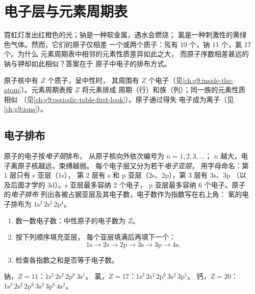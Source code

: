\chapter{电子层与元素周期表}\label{ch:g10:electron-shells}

霓虹灯发出红橙色的光；钠是一种软金属，遇水会燃烧；
氯是一种刺激性的黄绿色气体。然而，它们的原子仅相差
一个或两个质子：氖有 10 个，钠 11 个，氯 17 个。为什么
元素周期表中相邻的元素性质差异如此之大，
而原子序数相差甚远的钠与钾却如此相似？答案在于
原子中电子的排布方式。

\begin{recall}
原子核中有 $Z$ 个质子，呈中性时，
其周围有 $Z$ 个电子（见\cref{ch:g9:inside-the-atom}）。元素周期表按 $Z$ 将元素排成
周期（行）和族（列）；同一族的元素性质相似
（见\cref{ch:g9:periodic-table-first-look}）。原子通过得失
电子成为离子（见\cref{ch:g9:ions}）。
\end{recall}

\section{电子排布}

\begin{definition}\label{def:g10:electron-shells:configuration}
原子的电子按\emph{电子层}排布，
从原子核向外依次编号为 $n = 1, 2, 3, \ldots$；
$n$ 越大，电子离原子核越远，束缚越弱。
每个电子层又分为若干\emph{电子亚层}，
用字母命名：第 1 层只有 s 亚层（1s），
第 2 层有 s 和 p 亚层（2s、2p），第 3 层有 3s、3p
（以及后面才学的 3d）。s 亚层最多容纳 2 个电子，
p 亚层最多容纳 6 个电子。原子的\emph{电子排布}
列出各被占据亚层及其电子数，电子数作为指数写在右上角：
氧的电子排布为 $1\mathrm{s}^2\,2\mathrm{s}^2\,2\mathrm{p}^4$。
\end{definition}

\begin{method}[写出电子排布（至 $Z = 20$）]\label{met:g10:electron-shells:write}
\begin{enumerate}
  \item 数一数电子数：中性原子的电子数为 $Z$。
  \item 按下列顺序填充亚层，
        每个亚层填满后再填下一个：
        \[
          1\mathrm{s} \to 2\mathrm{s} \to 2\mathrm{p} \to 3\mathrm{s} \to
          3\mathrm{p} \to 4\mathrm{s}.
        \]
  \item 检查各指数之和是否等于电子数。
\end{enumerate}
钠，$Z = 11$：$1\mathrm{s}^2\,2\mathrm{s}^2\,2\mathrm{p}^6\,3\mathrm{s}^1$。
氯，$Z = 17$：$1\mathrm{s}^2\,2\mathrm{s}^2\,2\mathrm{p}^6\,3\mathrm{s}^2\,3\mathrm{p}^5$。
钙，$Z = 20$：$1\mathrm{s}^2\,2\mathrm{s}^2\,2\mathrm{p}^6\,3\mathrm{s}^2\,3\mathrm{p}^6\,4\mathrm{s}^2$。
\end{method}

